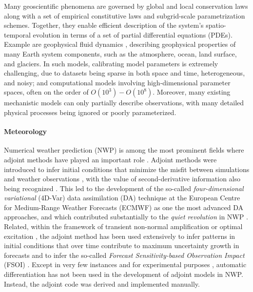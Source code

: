 Many geoscientific phenomena are governed by global and local conservation laws along with a set of empirical constitutive laws and subgrid-scale parametrization schemes. 
Together, they enable efficient description of the system's spatio-temporal evolution in terms of a set of partial differential equations (PDEs).
Example are geophysical fluid dynamics \cite{Vallis:2016kv}, describing geophysical properties of many Earth system components, such as the atmosphere, ocean, land surface, and glaciers.
In such models, calibrating model parameters is extremely challenging, due to datasets being sparse in both space and time, heterogeneous, and noisy; and computational models involving high-dimensional parameter spaces, often on the order of $O(10^3) - O(10^8)$.
Moreover, many existing mechanistic models can only partially describe observations, with many detailed physical processes being ignored or poorly parameterized. 



\paragraph{Meteorology}

Numerical weather prediction (NWP) is among the most prominent fields where adjoint methods have played an important role \cite{Errico_1997}. 
Adjoint methods were introduced to infer initial conditions that minimize the misfit between simulations and weather observations \cite{Talagrand.1987,Courtier.1987}, with the value of second-derivative information also being recognized \cite{Dimet.2002}. 
This led to the development of the so-called \textit{four-dimensional variational} (4D-Var) data assimilation (DA) technique \cite{Rabier.1992,Rabier:2000uu} at the European Centre for Medium-Range Weather Forecasts (ECMWF) as one the most advanced DA approaches, and which contributed substantially to the \textit{quiet revolution} in NWP \cite{Bauer.2015}.
Related, within the framework of transient non-normal amplification or optimal excitation \cite{Farrell.1988,Farrell:1996jx}, the adjoint method has been used extensively to infer patterns in initial conditions that over time contribute to maximum uncertainty growth in forecasts \cite{Palmer:1994br,Buizza:1995in} and to infer the so-called \textit{Forecast Sensitivity-based Observation Impact} (FSOI) \cite{Langland:2004jo}.
Except in very few instances and for experimental purposes \cite{Giering.2006}, automatic differentiation has not been used in the development of adjoint models in NWP.
Instead, the adjoint code was derived and implemented manually.

